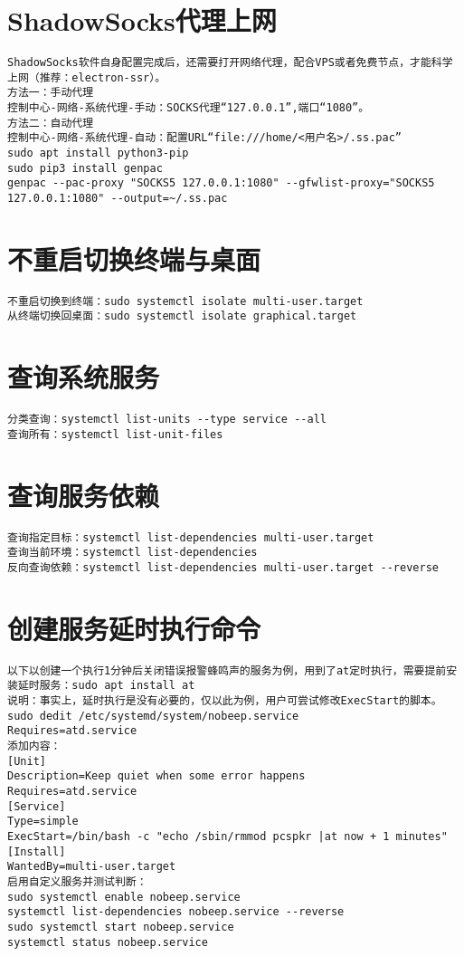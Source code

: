 \documentclass[a4paper,fontset=fandol,zihao=-4,linespread=1.2,oneside]{ctexbook}
\begin{document}
\section{ShadowSocks代理上网}
\begin{lstlisting}
ShadowSocks软件自身配置完成后，还需要打开网络代理，配合VPS或者免费节点，才能科学上网（推荐：electron-ssr）。
方法一：手动代理
控制中心-网络-系统代理-手动：SOCKS代理“127.0.0.1”,端口“1080”。
方法二：自动代理
控制中心-网络-系统代理-自动：配置URL“file:///home/<用户名>/.ss.pac”
sudo apt install python3-pip
sudo pip3 install genpac
genpac --pac-proxy "SOCKS5 127.0.0.1:1080" --gfwlist-proxy="SOCKS5 127.0.0.1:1080" --output=~/.ss.pac
\end{lstlisting}

\section{不重启切换终端与桌面}
\begin{lstlisting}
不重启切换到终端：sudo systemctl isolate multi-user.target
从终端切换回桌面：sudo systemctl isolate graphical.target
\end{lstlisting}

\section{查询系统服务}
\begin{lstlisting}
分类查询：systemctl list-units --type service --all
查询所有：systemctl list-unit-files
\end{lstlisting}

\section{查询服务依赖}
\begin{lstlisting}
查询指定目标：systemctl list-dependencies multi-user.target
查询当前环境：systemctl list-dependencies
反向查询依赖：systemctl list-dependencies multi-user.target --reverse
\end{lstlisting}

\section{创建服务延时执行命令}
\begin{lstlisting}
以下以创建一个执行1分钟后关闭错误报警蜂鸣声的服务为例，用到了at定时执行，需要提前安装延时服务：sudo apt install at
说明：事实上，延时执行是没有必要的，仅以此为例，用户可尝试修改ExecStart的脚本。
sudo dedit /etc/systemd/system/nobeep.service
Requires=atd.service
添加内容：
[Unit]
Description=Keep quiet when some error happens
Requires=atd.service
[Service]
Type=simple
ExecStart=/bin/bash -c "echo /sbin/rmmod pcspkr |at now + 1 minutes"
[Install]
WantedBy=multi-user.target
启用自定义服务并测试判断：
sudo systemctl enable nobeep.service
systemctl list-dependencies nobeep.service --reverse
sudo systemctl start nobeep.service
systemctl status nobeep.service
\end{lstlisting}
\end{document}
